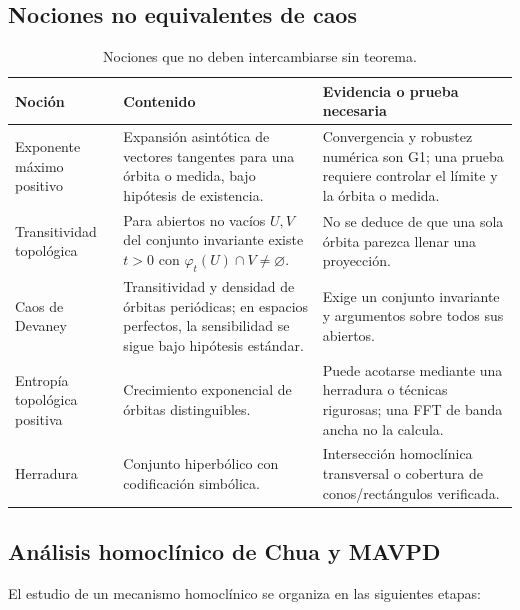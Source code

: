 \subsection{Nociones no equivalentes de caos}

\begin{table}[H]
\centering
\caption{Nociones que no deben intercambiarse sin teorema.}
\label{geo:tab:chaos-notions}
\small
\begin{tabularx}{\textwidth}{@{}L{0.20\textwidth}Y Y@{}}
\toprule
Noción & Contenido & Evidencia o prueba necesaria \\
\midrule
Exponente máximo positivo & Expansión asintótica de vectores tangentes para
una órbita o medida, bajo hipótesis de existencia. & Convergencia y robustez
numérica son G1; una prueba requiere controlar el límite y la órbita o medida.
\\
Transitividad topológica & Para abiertos no vacíos \(U,V\) del conjunto
invariante existe \(t>0\) con \(\varphi_t(U)\cap V\ne\varnothing\). & No se
deduce de que una sola órbita parezca llenar una proyección. \\
Caos de Devaney & Transitividad y densidad de órbitas periódicas; en espacios
perfectos, la sensibilidad se sigue bajo hipótesis estándar. & Exige un
conjunto invariante y argumentos sobre todos sus abiertos. \\
Entropía topológica positiva & Crecimiento exponencial de órbitas
distinguibles. & Puede acotarse mediante una herradura o técnicas rigurosas;
una FFT de banda ancha no la calcula. \\
Herradura & Conjunto hiperbólico con codificación simbólica. & Intersección
homoclínica transversal o cobertura de conos/rectángulos verificada. \\
\bottomrule
\end{tabularx}
\end{table}

\subsection{Análisis homoclínico de Chua y MAVPD}

El estudio de un mecanismo homoclínico se organiza en las siguientes etapas:

